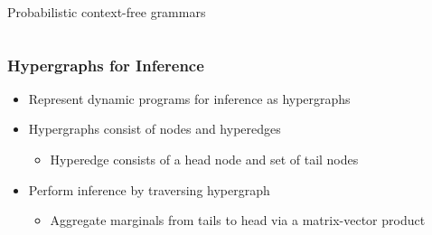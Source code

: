 \documentclass{beamer}
\begin{document}
\begin{frame}
\begin{itemize}
\begin{columns}
\begin{column}{0.5\textwidth}
\begin{center}

\vspace{.11em}
\small{Probabilistic context-free grammars}
\end{center}
\end{column}

\end{columns}
\end{itemize}

\end{frame}

\begin{frame}
\frametitle{Hypergraphs for Inference}
\begin{itemize}
\item Represent dynamic programs for inference as hypergraphs
\vspace{1em}
\item Hypergraphs consist of nodes and hyperedges
    \begin{itemize}
    \item Hyperedge consists of a head node and set of tail nodes
    \end{itemize}
\vspace{1em}
\item Perform inference by traversing hypergraph
    \begin{itemize}
    \item Aggregate marginals from tails to head via a matrix-vector product
    \end{itemize}
\end{itemize}
\begin{columns}

\begin{column}{0.5\textwidth}
\begin{center}
\end{center}
\end{column}

\begin{column}{0.5\textwidth}
\begin{center}
\begin{tikzpicture}


\end{tikzpicture}
\end{center}
\end{column}
\end{columns}
\end{frame}
\end{document}
